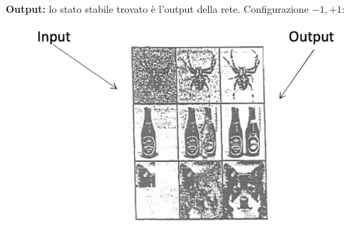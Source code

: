 \textbf{Output:} lo stato stabile trovato è l'output della rete.
\newline
\newline
Configurazione $-1,+1$:
\begin{figure}[!h]
    \includegraphics[scale=.35]{images/hopfield_networks/config.png}
    \centering
\end{figure}


